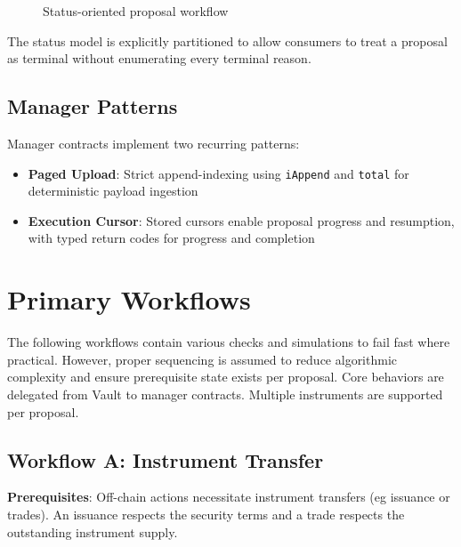 \documentclass[10pt]{article}
\begin{document}
\begin{figure}[h!]
    \caption{Status-oriented proposal workflow}
    \label{fig:proposal-seq-status}
\end{figure}

The status model is explicitly partitioned to allow consumers to treat a proposal as terminal without enumerating every terminal reason.

\subsection{Manager Patterns}
Manager contracts implement two recurring patterns:

\begin{itemize}
    \item \textbf{Paged Upload}: Strict append-indexing using \texttt{iAppend}
          and \texttt{total} for deterministic payload ingestion

    \item \textbf{Execution Cursor}: Stored cursors enable proposal progress and resumption, with typed return codes for progress and completion
\end{itemize}

\clearpage
\section{Primary Workflows}

The following workflows contain various checks and simulations to fail fast where practical. However, proper sequencing is assumed to reduce algorithmic complexity and ensure prerequisite state exists per proposal. Core behaviors are delegated from Vault to manager contracts. Multiple instruments are supported per proposal.

\subsection{Workflow A: Instrument Transfer}
\textbf{Prerequisites}: Off-chain actions necessitate instrument transfers (eg issuance or trades). An issuance respects the security terms and a trade respects the outstanding instrument supply.
\end{document}
